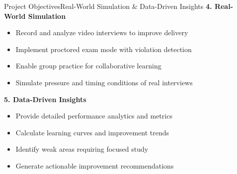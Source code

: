 \documentclass{beamer}
\begin{document}
\begin{frame}{Project Objectives}{Real-World Simulation \& Data-Driven Insights}
\textbf{4. Real-World Simulation}
\begin{itemize}
    \item Record and analyze video interviews to improve delivery
    \item Implement proctored exam mode with violation detection
    \item Enable group practice for collaborative learning
    \item Simulate pressure and timing conditions of real interviews
\end{itemize}

\textbf{5. Data-Driven Insights}
\begin{itemize}
    \item Provide detailed performance analytics and metrics
    \item Calculate learning curves and improvement trends
    \item Identify weak areas requiring focused study
    \item Generate actionable improvement recommendations
\end{itemize}
\end{frame}

\end{document}

